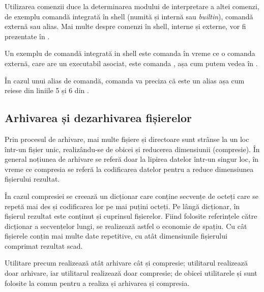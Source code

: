 Utilizarea comenzii  duce la determinarea modului de interpretare a altei comenzi, de exemplu comandă integrată în shell (numită și internă sau \textit{builtin}), comandă externă sau alias. Mai multe despre comenzi în shell, interne și externe, vor fi prezentate în .

Un exemplu de comandă integrată in shell este comanda  în vreme ce o comanda externă, care are un executabil asociat, este comanda , așa cum putem vedea în .


În cazul unui alias de comandă, comanda  va preciza că este un alias așa cum reiese din liniile 5 și 6 din .

\subsection{Arhivarea și dezarhivarea fișierelor}
\label{sec:fs:archive}

Prin procesul de arhivare, mai multe fișiere și directoare sunt strânse la un loc într-un fișier unic, realizându-se de obicei și reducerea dimensiunii (compresie). În general noțiunea de arhivare se referă doar la lipirea datelor într-un singur loc, în vreme ce compresia se referă la codificarea datelor pentru a reduce dimensiunea fișierului rezultat.

În cazul compresiei se creează un dicționar care conține secvențe de octeți care se repetă mai des și codificarea lor pe mai puțini octeți. Pe lângă dicționar, în fișierul rezultat este conținut și cuprinsul fișierelor. Fiind folosite referințele către dicționar a secvențelor lungi, se realizează astfel o economie de spațiu. Cu cât fișierele conțin mai multe date repetitive, cu atât dimensiunile fișierului comprimat rezultat scad.

Utilitare precum  realizează atât arhivare cât și compresie; utilitarul  realizează doar arhivare, iar utilitarul  realizează doar compresie; de obicei utilitarele  și  sunt folosite la comun pentru a realiza și arhivarea și compresia.

